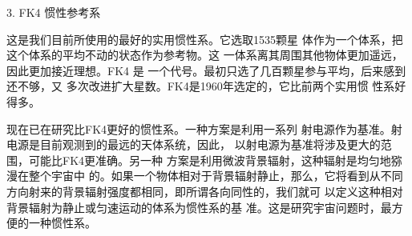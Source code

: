 \textsf{3. FK4 惯性参考系}

这是我们目前所使用的最好的实用惯性系。它选取1535颗星
体作为一个体系，把这个体系的平均不动的状态作为参考物。这
一体系离其周围其他物体更加遥远，因此更加接近理想。FK4
\clearpage\noindent
是
一个代号。最初只选了几百颗星参与平均，后来感到还不够，又
多次改进扩大星数。FK4是1960年选定的，它比前两个实用惯
性系好得多。

现在已在研究比FK4更好的惯性系。一种方案是利用一系列
射电源作为基准。射电源是目前观测到的最远的天体系统，因此，
以射电源为基准将涉及更大的范围，可能比FK4更准确。另一种
方案是利用微波背景辐射，这种辐射是均匀地猕漫在整个宇宙中
的。如果一个物体相对于背景辐射静止，那么，它将看到从不同
方向射来的背景辐射强度都相同，即所谓各向同性的，我们就可
以定义这种相对背景辐射为静止或匀速运动的体系为惯性系的基
准。这是研究宇宙问题时，最方便的一种惯性系。
